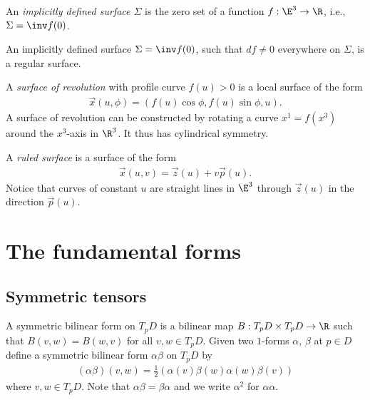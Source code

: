 \documentclass{article}
\begin{document}
\begin{definition}
    An \emph{implicitly defined surface $\Sigma$} is the zero set of a function
    $f:\E^3\to\R$, i.e., $\Sigma=\inv f(0)$.
\end{definition}

\begin{proposition}
    An implicitly defined surface $\Sigma = \inv f(0)$, such that $df\not=0$
    everywhere on $\Sigma$, is a regular surface.
\end{proposition}

\begin{definition}
    A \emph{surface of revolution} with profile curve $f(u)>0$ is a local 
    surface of the form 
    \begin{align*}
        \vec x(u, \phi) = (f(u)\cos\phi,f(u)\sin\phi,u).
    \end{align*}
    A surface of revolution can be constructed by rotating a curve $x^1=f(x^3)$
    around the $x^3$-axis in $\R^3$. It thus has cylindrical symmetry.
\end{definition}

\begin{definition}
    A \emph{ruled surface} is a surface of the form 
    \begin{align*}
        \vec x(u,v)= \vec z(u) + v\vec p(u).
    \end{align*}
    Notice that curves of constant $u$ are straight lines in $\E^3$ through 
    $\vec z(u)$ in the direction $\vec p(u)$.
\end{definition}

\section{The fundamental forms}

\subsection{Symmetric tensors}

\begin{definition}
    A symmetric bilinear form on $T_pD$ is a bilinear map $B:T_pD\times T_pD 
    \to\R$ such that $B(v,w)=B(w,v)$ for all $v,w\in T_pD$. Given two $1$-forms
    $\alpha$, $\beta$ at $p\in D$ define a symmetric bilinear form $\alpha\beta$
    on $T_pD$ by 
    \begin{align*}
        (\alpha\beta)(v, w) = \frac{1}{2}(\alpha(v)\beta(w) \alpha(w)\beta(v)) 
    \end{align*}
    where $v,w\in T_pD$. Note that $\alpha\beta=\beta\alpha$ and we write $\alpha^2$
    for $\alpha\alpha$.
\end{definition}
\end{document}
